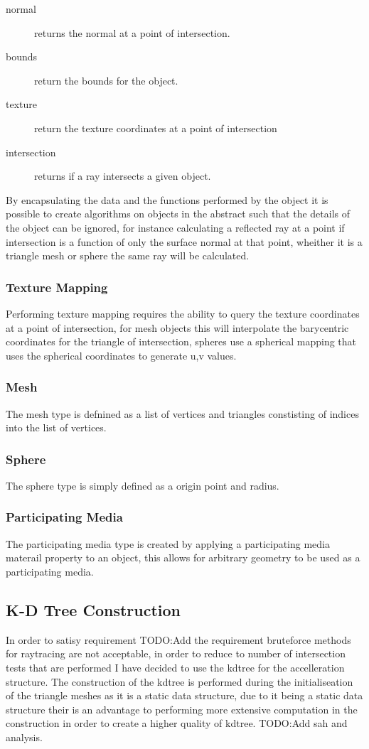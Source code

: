 \begin{description}
\item[normal] returns the normal at a point of intersection.
\item[bounds] return the bounds for the object.
\item[texture] return the texture coordinates at a point of intersection
\item[intersection] returns if a ray intersects a given object.
\end{description}

By encapsulating the data and the functions performed by the object it is possible to create algorithms on objects in the
abstract such that the details of the object can be ignored, for instance calculating a reflected ray at a point if intersection
is a function of only the surface normal at that point, wheither it is a triangle mesh or sphere the same ray will be calculated.

\subsubsection{Texture Mapping}
Performing texture mapping requires the ability to query the texture coordinates at a point of intersection, for mesh objects this
will interpolate the barycentric coordinates for the triangle of intersection, spheres use a spherical mapping that uses the
spherical coordinates to generate u,v values.

\subsubsection{Mesh}
The mesh type is defnined as a list of vertices and triangles constisting of indices into the list of vertices.

\subsubsection{Sphere}
The sphere type is simply defined as a origin point and radius.

\subsubsection{Participating Media}
The participating media type is created by applying a participating media materail property to an object, this allows
for arbitrary geometry to be used as a participating media.

\subsection{K-D Tree Construction}
In order to satisy requirement TODO:Add the requirement bruteforce methods for raytracing are not acceptable, in order to reduce
to number of intersection tests that are performed I have decided to use the kdtree for the accelleration structure. The
construction of the kdtree is performed during the initialiseation of the triangle meshes as it is a static data structure, due
to it being a static data structure their is an advantage to performing more extensive computation in the construction in
order to create a higher quality of kdtree. TODO:Add sah and analysis.

